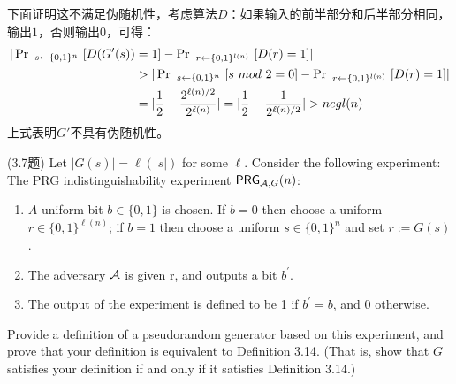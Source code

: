 \begin{questions}
\begin{solution}
            下面证明这不满足伪随机性，考虑算法$D$：如果输入的前半部分和后半部分相同，输出$1$，否则输出$0$，可得：
            \begin{equation}
                \begin{aligned}
                    |\Pr\ _{s\leftarrow{\set{0,1}^n}}\ [D(G'(s))&=1]-\Pr\ _{r\leftarrow{\set{0,1}^{l(n)}}}\ [D(r)=1]|\\
                    &>|\Pr\ _{s\leftarrow{\set{0,1}^n}}\ [s\ mod\ 2=0]-\Pr\ _{r\leftarrow{\set{0,1}^{l(n)}}}\ [D(r)=1]|\\
                    &=|\frac{1}{2}-\frac{2^{\ell(n)/2}}{2^{\ell(n)}}|=|\frac{1}{2}-\frac{1}{2^{\ell(n)/2}}|>negl(n)
                \end{aligned}
            \end{equation}
            上式表明$G'$不具有伪随机性。
        \end{solution}

    \question (3.7题) Let $|G(s)|=\ell(|s|)$ for some $\ell$. Consider the following experiment:\\The PRG indistinguishability experiment $\mathsf{PRG}_{\mathcal{A},G}(n)$:

        \begin{enumerate}
            \item $A$ uniform bit $b\in\{0,1\}$ is chosen. If $b=0$ then choose a uniform $r\in\{0,1\}^{\ell(n)}$; if $b=1$ then choose a uniform $s\in\{0,1\}^n$ and set $r:=G(s)$.
            \item The adversary $\mathcal{A}$ is given r, and outputs a bit ${b}^{'}$.
            \item The output of the experiment is defined to be 1 if ${b}^{'}=b$, and 0 otherwise.
        \end{enumerate}

        Provide a definition of a pseudorandom generator based on this experiment, and prove that your definition is equivalent to Definition 3.14. (That is, show that $G$ satisfies your definition if and only if it satisfies Definition 3.14.)


\end{questions}

